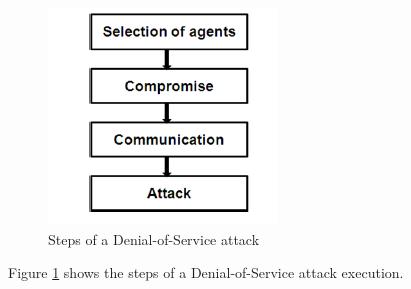 \begin{figure}
	\includegraphics[width=1.0\columnwidth]{images/dossteps.PNG}
	\caption{Steps of a Denial-of-Service attack \cite{monowar01}}
	\label{F:doss}
\end{figure}
Figure \ref{F:doss} shows the steps of a Denial-of-Service attack execution.\\

